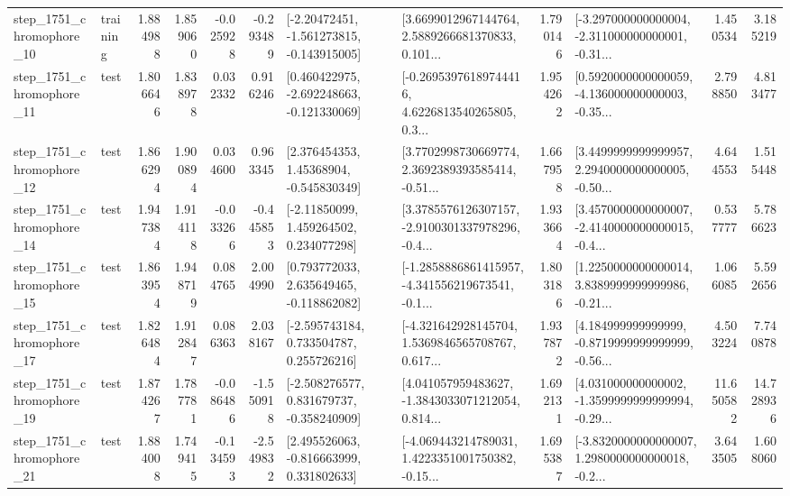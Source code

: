 \begin{tabular}{llrrrrllrlrr}
 step\_1751\_chromophore\_10 &  training &      1.884988 &    1.859060 &     -0.025928 & -0.293489 &   [-2.20472451, -1.561273815, -0.143915005] &  [3.6699012967144764, 2.5889266681370833, 0.101... &       1.790146 &  [-3.297000000000004, -2.311000000000001, -0.31... &            1.450534 &          3.185219 \\
 step\_1751\_chromophore\_11 &      test &      1.806646 &    1.838978 &      0.032332 &  0.916246 &   [0.460422975, -2.692248663, -0.121330069] &  [-0.26953976189744416, 4.6226813540265805, 0.3... &       1.954262 &  [0.5920000000000059, -4.136000000000003, -0.35... &            2.798850 &          4.813477 \\
 step\_1751\_chromophore\_12 &      test &      1.866294 &    1.900894 &      0.034600 &  0.963345 &     [2.376454353, 1.45368904, -0.545830349] &  [3.7702998730669774, 2.3692389393585414, -0.51... &       1.667958 &  [3.4499999999999957, 2.2940000000000005, -0.50... &            4.644553 &          1.515448 \\
 step\_1751\_chromophore\_14 &      test &      1.947384 &    1.914118 &     -0.033266 & -0.445853 &     [-2.11850099, 1.459264502, 0.234077298] &  [3.3785576126307157, -2.9100301337978296, -0.4... &       1.933664 &  [3.4570000000000007, -2.4140000000000015, -0.4... &            0.537777 &          5.786623 \\
 step\_1751\_chromophore\_15 &      test &      1.863954 &    1.948719 &      0.084765 &  2.004990 &    [0.793772033, 2.635649465, -0.118862082] &  [-1.2858886861415957, -4.341556219673541, -0.1... &       1.803186 &  [1.2250000000000014, 3.8389999999999986, -0.21... &            1.066085 &          5.592656 \\
 step\_1751\_chromophore\_17 &      test &      1.826484 &    1.912847 &      0.086363 &  2.038167 &    [-2.595743184, 0.733504787, 0.255726216] &  [-4.321642928145704, 1.5369846565708767, 0.617... &       1.937872 &  [4.184999999999999, -0.8719999999999999, -0.56... &            4.503224 &          7.740878 \\
 step\_1751\_chromophore\_19 &      test &      1.874267 &    1.787781 &     -0.086486 & -1.550918 &   [-2.508276577, 0.831679737, -0.358240909] &  [4.041057959483627, -1.3843033071212054, 0.814... &       1.692131 &  [4.031000000000002, -1.3599999999999994, -0.29... &           11.650582 &         14.728936 \\
 step\_1751\_chromophore\_21 &      test &      1.884008 &    1.749415 &     -0.134593 & -2.549832 &    [2.495526063, -0.816663999, 0.331802633] &  [-4.069443214789031, 1.4223351001750382, -0.15... &       1.695387 &  [-3.8320000000000007, 1.2980000000000018, -0.2... &            3.643505 &          1.608060 \\

\end{tabular}
